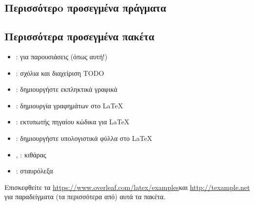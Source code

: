 \documentclass{beamer}
\begin{document}
\subsection{Περισσότερo προσεγμένα πράγματα}
\begin{frame}[fragile]{\insertsubsection}
\end{frame}
\gr
\subsection{Περισσότερα προσεγμένα πακέτα}
\begin{frame}{\insertsubsection}
\begin{itemize}
\item \en{}\gr: για παρουσιάσεις (όπως αυτή!)
\item \en{}\gr: σχόλια και διαχείριση \en TODO\gr
\item \en{}\gr: δημιουργήστε εκπληκτικά γραφικά
\item \en{}\gr: δημιουργία γραφημάτων στο \LaTeX
\item \en{}\gr: εκτυπωτής πηγαίου κώδικα για \LaTeX
\item \en{}\gr: δημιουργήστε υπολογιστικά φύλλα στο \LaTeX
\item \en{}, \gr: κιθάρας
\item \en{}\gr: σταυρόλεξα
\end{itemize}
Επισκεφθείτε τα \space \en\url{https://www.overleaf.com/latex/examples}\gr \space και \en \url{http://texample.net}\gr \space
για παραδείγματα (τα περισσότερα από) αυτά τα πακέτα.
\end{frame}
\end{document}
